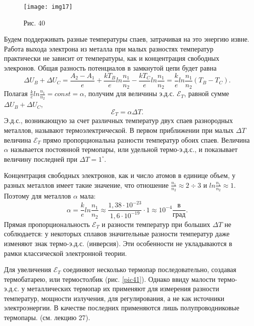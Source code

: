 \documentclass[a4paper,10pt]{book}
\begin{document}
\begin{figure}[h]
\texttt{[image: img17]}
\caption{Рис. 40}
\label{img17}
\end{figure}
Будем поддерживать разные температуры спаев, затрачивая на это энергию извне. Работа выхода электрона из металла при малых разностях температур практически не зависит от температуры, как и концентрация свободных элекронов. Общая разность потенциалов в замкнутой цепи будет равна
\begin{equation}\label{197}
 \Delta U_B + \Delta U_C = \frac{A_2 - A_1}{e} + \frac{kT_B}{e}ln\frac{n_1}{n_2} - \frac{kT_C}{e}ln\frac{n_1}{n_2} = \frac{k}{e}ln\frac{n_1}{n_2}(T_B - T_C).
\end{equation}
Полагая $\frac{k}{e}ln\frac{n_1}{n_2} = const = \alpha$, получим для величины э.д.с. $\mathcal{E}_T$, равной сумме $\Delta U_B + \Delta U_C$,
\begin{equation}\label{198}
 \mathcal{E}_T = \alpha\Delta T.
\end{equation}
Э.д.с., возникающую за счет различных температур двух спаев разнородных металлов, называют термоэлектрической. В первом приближении при малых $\Delta T$ величина $\mathcal{E}_T$ прямо пропорциональна разности температур обоих спаев. Величина $\alpha$ называется постоянной термопары, или удельной термо-э.д.с., и показывает величину последней при $\Delta T = 1^\circ$.

Концентрация свободных электронов, как и число атомов в единице объем, у разных металлов имеет такие значение, что отношение $\frac{n_1}{n_2} \approx 2 \div 3$ и $ln\frac{n_1}{n_2} \approx 1$. Поэтому для металлов $\alpha$ мала:
\begin{equation*}
 \alpha = \frac{k}{e}ln\frac{n_1}{n_2} \approx \frac{1,38\cdot 10^{-23}}{1,6\cdot 10^{-19}}\cdot 1 \approx 10^{-4}\frac{\text{в}}{\text{град}}.
\end{equation*}
Прямая пропорциональность $\mathcal{E}_T$ и разности температур при больших $\Delta T$ не соблюдается: у некоторых сплавов значительные разности температур даже изменяют знак термо-э.д.с. (инверсия). Эти особенности не укладываются в рамки классической электронной теории.

Для увеличения $\mathcal{E}_T$ соединяют несколько термопар последовательно, создавая термобатарею, или термостолбик (рис. \ref{pic41}).
Однако ввиду малости термо-э.д.с. у металлических термопар их применяют для измерения разности температур, мощности излучения, для регулирования, а не как источники электроэнергии. В качестве последних применяются лишь полупроводниковые термопары. (см. лекцию 27).
\end{document}
